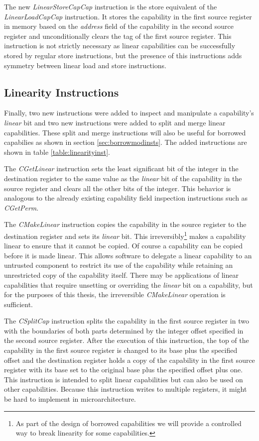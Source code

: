 The new \textit{LinearStoreCapCap} instruction is the store equivalent of the \textit{LinearLoadCapCap} instruction. It stores the capability in the first source register in memory based on the \textit{address} field of the capability in the second source register and unconditionally clears the tag of the first source register. This instruction is not strictly necessary as linear capabilities can be successfully stored by regular store instructions, but the presence of this instructions adds symmetry between linear load and store instructions.

\subsection{Linearity Instructions}
Finally, two new instructions were added to inspect and manipulate a capability's \textit{linear} bit and two new instructions were added to split and merge linear capabilities. These split and merge instructions will also be useful for borrowed capabilies as shown in section \ref{sec:borrowmodinsts}. The added instructions are shown in table \ref{table:linearityinst}.

The \textit{CGetLinear} instruction sets the least significant bit of the integer in the destination register to the same value as the \textit{linear} bit of the capability in the source register and clears all the other bits of the integer. This behavior is analogous to the already existing capability field inspection instructions such as \textit{CGetPerm}.

The \textit{CMakeLinear} instruction copies the capability in the source register to the destination register and sets its \textit{linear} bit. This irreversibly\footnote{As part of the design of borrowed capabilities we will provide a controlled way to break linearity for some capabilities.} makes a capability linear to ensure that it cannot be copied. Of course a capability can be copied before it is made linear. This allows software to delegate a linear capability to an untrusted component to restrict its use of the capability while retaining an unrestricted copy of the capability itself. There may be applications of linear capabilities that require unsetting or overriding the \textit{linear} bit on a capability, but for the purposes of this thesis, the irreversible \textit{CMakeLinear} operation is sufficient.

The \textit{CSplitCap} instruction splits the capability in the first source register in two with the boundaries of both parts determined by the integer offset specified in the second source register. After the execution of this instruction, the top of the capability in the first source register is changed to its base plus the specified offset and the destination register holds a copy of the capability in the first source register with its base set to the original base plus the specified offset plus one. This instruction is intended to split linear capabilities but can also be used on other capabilities. Because this instruction writes to multiple registers, it might be hard to implement in microarchitecture.


